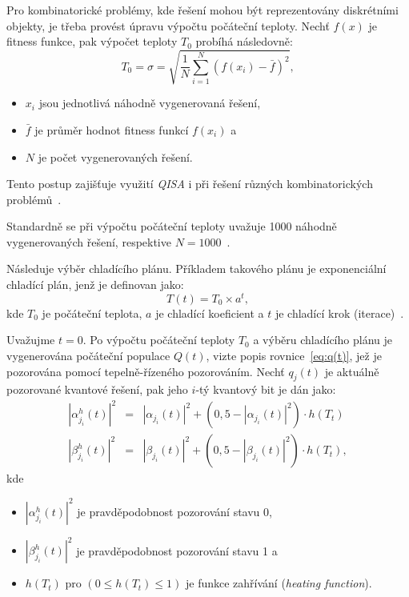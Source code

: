 Pro kombinatorické problémy, kde řešení mohou být reprezentovány diskrétními objekty, je třeba provést úpravu výpočtu počáteční teploty. 
Nechť $f(x)$ je fitness funkce, pak výpočet teploty $T_0$ probíhá následovně:
\begin{equation*}
    T_0 = \sigma = \sqrt{\frac{1}{N}\sum_{i=1}^{N}\left( f\left(x_i\right) - \bar{f}\right)^2},
\end{equation*}
\begin{itemize}
    \item $x_i$ jsou jednotlivá náhodně vygenerovaná řešení,
    \item $\bar{f}$ je průměr hodnot fitness funkcí $f(x_i)$ a
    \item $N$ je počet vygenerovaných řešení.
\end{itemize}
Tento postup zajišťuje využití \emph{QISA} i při řešení různých kombinatorických problémů~\cite{qisa,FundamentalsOfProbability}. 

Standardně se při výpočtu počáteční teploty uvažuje 1000 náhodně vygenerovaných řešení, respektive $N=1000$~\cite{qisa}.

Následuje výběr chladícího plánu. Příkladem takového plánu je exponenciální chladící plán, jenž je definovan jako:
\begin{equation*}
    T(t) = T_0 \times a^t,
\end{equation*}
kde $T_0$ je počáteční teplota, $a$ je chladící koeficient a $t$ je chladící krok (iterace)~\cite{qisa}. 

Uvažujme $t= 0$. Po výpočtu počáteční teploty $T_0$ a výběru chladícího plánu je vygenerována počáteční populace $Q(t)$, vizte popis rovnice~\ref{eq:q(t)}, jež je pozorována pomocí tepelně-řízeného pozorováním. 
Nechť $q_j(t)$ je aktuálně pozorované kvantové řešení, pak jeho $i$-tý kvantový bit je dán jako:
\begin{eqnarray*}
    \left|\alpha_{j_i}^h\left(t\right)\right|^2 &=& \left|\alpha_{j_i}\left(t\right)\right|^2 + \left(0,5 - \left|\alpha_{j_i}\left(t\right)\right|^2\right) \cdot h\left(T_t\right) \\
    \left|\beta_{j_i}^h\left(t\right) \right|^2 &=& \left|\beta_{j_i}\left(t\right) \right|^2 + \left(0,5 - \left|\beta_{j_i}\left(t\right) \right|^2\right) \cdot h\left(T_t\right),
\end{eqnarray*}
kde 
\begin{itemize}
    \item $\left|\alpha_{j_i}^h\left(t\right)\right|^2$ je pravděpodobnost pozorování stavu 0,
    \item $\left|\beta_{j_i}^h\left(t\right)\right|^2$ je pravděpodobnost pozorování stavu 1 a
    \item $h(T_t)$ pro $\left(0 \leq h(T_t) \leq 1 \right)$ je funkce zahřívání (\emph{heating function}). 
\end{itemize}

